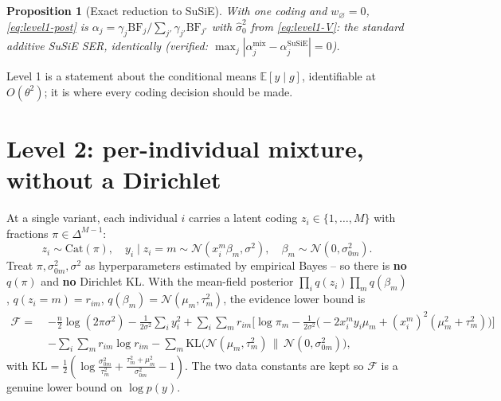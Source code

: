 \documentclass[11pt]{article}
\newcommand{\N}{\mathcal{N}}
\newcommand{\E}{\mathbb{E}}
\newcommand{\KL}{\mathrm{KL}}
\newcommand{\BF}{\mathrm{BF}}
\newcommand{\simplex}{\Delta}
\newtheorem{proposition}{Proposition}
\begin{document}
\begin{proposition}[Exact reduction to SuSiE]
With one coding and $w_\varnothing=0$, \eqref{eq:level1-post} is
$\alpha_j=\gamma_j\BF_j/\sum_{j'}\gamma_{j'}\BF_{j'}$ with $\hat\sigma_0^2$ from
\eqref{eq:level1-V}: the standard additive SuSiE SER, identically (verified:
$\max_j|\alpha_j^{\mathrm{mix}}-\alpha_j^{\mathrm{SuSiE}}|=0$).
\end{proposition}

\noindent Level 1 is a statement about the conditional means $\E[y\mid g]$,
identifiable at $O(\theta^2)$; it is where every coding decision should be made.

\section{Level 2: per-individual mixture, without a Dirichlet}
\label{sec:level2}
At a single variant, each individual $i$ carries a latent coding
$z_i\in\{1,\dots,M\}$ with fractions $\pi\in\simplex^{M-1}$:
\begin{equation}
z_i\sim\mathrm{Cat}(\pi),\quad
y_i\mid z_i{=}m \sim \N(x_i^m\beta_m,\sigma^2),\quad
\beta_m\sim\N(0,\sigma_{0m}^2).
\label{eq:pim}
\end{equation}
Treat $\pi,\sigma_{0m}^2,\sigma^2$ as hyperparameters estimated by empirical
Bayes -- so there is \textbf{no} $q(\pi)$ and \textbf{no} Dirichlet KL. With the
mean-field posterior $\prod_i q(z_i)\prod_m q(\beta_m)$, $q(z_i{=}m)=r_{im}$,
$q(\beta_m)=\N(\mu_m,\tau_m^2)$, the evidence lower bound is
\begin{equation}
\begin{aligned}
\mathcal F=\;&
-\tfrac{n}{2}\log(2\pi\sigma^2)-\tfrac{1}{2\sigma^2}\sum_i y_i^2
+\sum_i\sum_m r_{im}\Big[\log\pi_m
-\tfrac{1}{2\sigma^2}\big({-}2x_i^m y_i\mu_m+(x_i^m)^2(\mu_m^2+\tau_m^2)\big)\Big]\\
&-\sum_i\sum_m r_{im}\log r_{im}
-\sum_m \KL\!\big(\N(\mu_m,\tau_m^2)\,\|\,\N(0,\sigma_{0m}^2)\big),
\end{aligned}
\label{eq:elbo}
\end{equation}
with $\KL=\tfrac12(\log\tfrac{\sigma_{0m}^2}{\tau_m^2}
+\tfrac{\tau_m^2+\mu_m^2}{\sigma_{0m}^2}-1)$. The two data constants are kept so
$\mathcal F$ is a genuine lower bound on $\log p(y)$.
\end{document}
